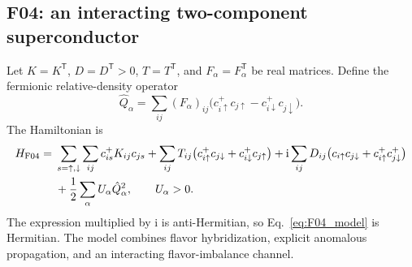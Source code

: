 \documentclass[onecolumn,aps,prb,amsmath,amssymb,superscriptaddress,longbibliography,floatfix]{revtex4-2}
\newcommand{\ii}{\mathrm{i}}
\newcommand{\trans}{\mathsf{T}}
\begin{document}
\subsection*{F04: an interacting two-component superconductor}

Let \(K=K^\trans\), \(D=D^\trans>0\), \(T=T^\trans\), and \(F_\alpha=F_\alpha^\trans\) be real matrices.  Define the fermionic relative-density operator
\begin{equation}
\hat Q_\alpha
=\sum_{ij}(F_\alpha)_{ij}
\bigl(c_{i\uparrow}^+c_{j\uparrow}
-c_{i\downarrow}^+c_{j\downarrow}\bigr).
\end{equation}
The Hamiltonian is
\begin{align}
H_{\rm F04}={}&
\sum_{s=\uparrow,\downarrow}\sum_{ij}c_{is}^+K_{ij}c_{js}
+\sum_{ij}T_{ij}
\bigl(c_{i\uparrow}^+c_{j\downarrow}
+c_{i\downarrow}^+c_{j\uparrow}\bigr)
+\ii\sum_{ij}D_{ij}
\bigl(c_{i\uparrow}c_{j\downarrow}
+c_{i\uparrow}^+c_{j\downarrow}^+\bigr)\notag\\
&+\frac12\sum_\alpha U_\alpha\hat Q_\alpha^2,
\qquad U_\alpha>0.
\label{eq:F04_model}
\end{align}
The expression multiplied by \(\ii\) is anti-Hermitian, so Eq.~\eqref{eq:F04_model} is Hermitian.  The model combines flavor hybridization, explicit anomalous propagation, and an interacting flavor-imbalance channel.
\end{document}
